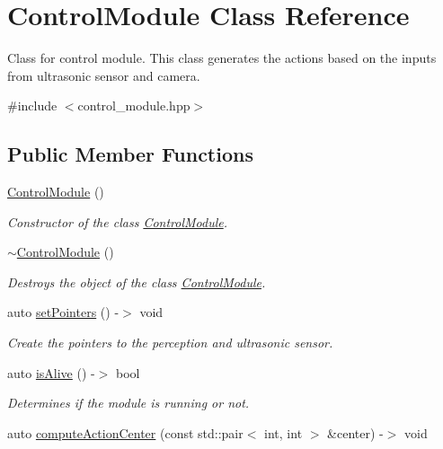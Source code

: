 \hypertarget{class_control_module}{}\section{Control\+Module Class Reference}
\label{class_control_module}


Class for control module. This class generates the actions based on the inputs from ultrasonic sensor and camera.  




{\ttfamily \#include $<$control\+\_\+module.\+hpp$>$}

\subsection*{Public Member Functions}
\begin{DoxyCompactItemize}
\item 
\hyperlink{class_control_module_a260b3e131b096cf456aff663aebfa6b4}{Control\+Module} ()
\begin{DoxyCompactList}\small\item\em Constructor of the class \hyperlink{class_control_module}{Control\+Module}. \end{DoxyCompactList}\item 
\hyperlink{class_control_module_ade41c6a3ce7c8e4df978c611bc0d9fa8}{$\sim$\+Control\+Module} ()
\begin{DoxyCompactList}\small\item\em Destroys the object of the class \hyperlink{class_control_module}{Control\+Module}. \end{DoxyCompactList}\item 
auto \hyperlink{class_control_module_a94f0a8b044f12df1c381655648e68aa5}{set\+Pointers} () -\/$>$ void
\begin{DoxyCompactList}\small\item\em Create the pointers to the perception and ultrasonic sensor. \end{DoxyCompactList}\item 
auto \hyperlink{class_control_module_a051b5a9bdf80ce3c21da8db10705740b}{is\+Alive} () -\/$>$ bool
\begin{DoxyCompactList}\small\item\em Determines if the module is running or not. \end{DoxyCompactList}\item 
auto \hyperlink{class_control_module_a82c3a2a8d0140432b7dd364a4388fff2}{compute\+Action\+Center} (const std\+::pair$<$ int, int $>$ \&center) -\/$>$ void

\end{DoxyCompactItemize}
